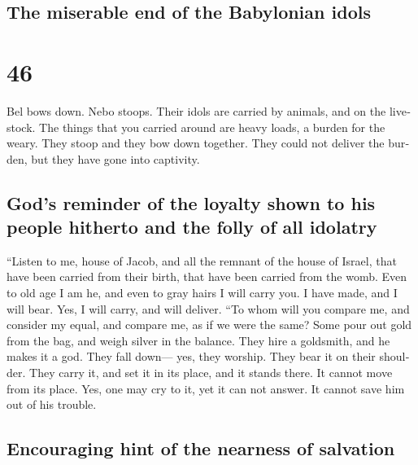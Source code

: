 \begin{paracol}{2}
\switchcolumn
\begin{otherlanguage}{english}

\hypertarget{the-miserable-end-of-the-babylonian-idols}{%
\subsection{The miserable end of the Babylonian
idols}\label{the-miserable-end-of-the-babylonian-idols}}

\hypertarget{section-91}{%
\section{46}\label{section-91}}

 Bel bows down. Nebo stoops. Their idols are carried by
animals, and on the livestock. The things that you carried around are
heavy loads, a burden for the weary.  They stoop and they
bow down together. They could not deliver the burden, but they have gone
into captivity.

\hypertarget{gods-reminder-of-the-loyalty-shown-to-his-people-hitherto-and-the-folly-of-all-idolatry}{%
\subsection{God's reminder of the loyalty shown to his people hitherto
and the folly of all
idolatry}\label{gods-reminder-of-the-loyalty-shown-to-his-people-hitherto-and-the-folly-of-all-idolatry}}

 ``Listen to me, house of Jacob, and all the remnant of
the house of Israel, that have been carried from their birth, that have
been carried from the womb.  Even to old age I am he, and
even to gray hairs I will carry you. I have made, and I will bear. Yes,
I will carry, and will deliver.  ``To whom will you
compare me, and consider my equal, and compare me, as if we were the
same?  Some pour out gold from the bag, and weigh silver
in the balance. They hire a goldsmith, and he makes it a god. They fall
down--- yes, they worship.  They bear it on their
shoulder. They carry it, and set it in its place, and it stands there.
It cannot move from its place. Yes, one may cry to it, yet it can not
answer. It cannot save him out of his trouble.

\hypertarget{encouraging-hint-of-the-nearness-of-salvation}{%
\subsection{Encouraging hint of the nearness of
salvation}\label{encouraging-hint-of-the-nearness-of-salvation}}


\end{otherlanguage}
\end{paracol}
